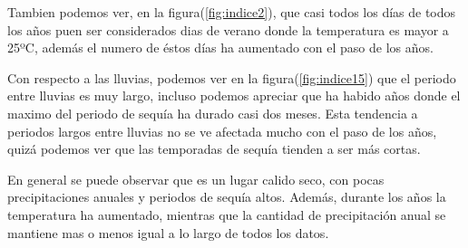 \documentclass[12pt]{article}
\begin{document}
 Tambien podemos ver, en la figura(\ref{fig:indice2}), que casi todos los días de todos los años puen ser considerados dias de verano donde la temperatura es mayor a 25ºC, además el numero de éstos días ha aumentado con el paso de los años.
 
 Con respecto a las lluvias, podemos ver en la figura(\ref{fig:indice15}) que el periodo entre lluvias es muy largo, incluso podemos apreciar que ha habido años donde el maximo del periodo de sequía ha durado casi dos meses. Esta tendencia a periodos largos entre lluvias no se ve afectada mucho con el paso de los años, quizá podemos ver que las temporadas de sequía tienden a ser más cortas.
 
 En general se puede observar que es un lugar calido seco, con pocas precipitaciones anuales y periodos de sequía altos. Además, durante los años la temperatura ha aumentado, mientras que la cantidad de precipitación anual se mantiene mas o menos igual a lo largo de todos los datos.
 
\end{document}
